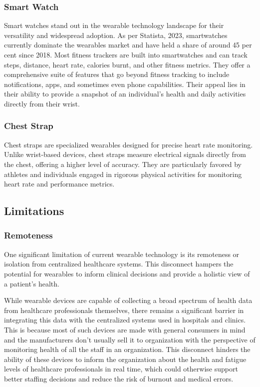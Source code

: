 \subsubsection{Smart Watch}
Smart watches stand out in the wearable technology landscape for their versatility and widespread adoption. As per Statista, 2023, smartwatches currently dominate the wearables market and have held a share of around 45 per cent since 2018. Most fitness trackers are built into smartwatches and can track steps, distance, heart rate, calories burnt, and other fitness metrics. They offer a comprehensive suite of features that go beyond fitness tracking to include notifications, apps, and sometimes even phone capabilities. Their appeal lies in their ability to provide a snapshot of an individual's health and daily activities directly from their wrist.

\subsubsection{Chest Strap}
Chest straps are specialized wearables designed for precise heart rate monitoring. Unlike wrist-based devices, chest straps measure electrical signals directly from the chest, offering a higher level of accuracy. They are particularly favored by athletes and individuals engaged in rigorous physical activities for monitoring heart rate and performance metrics.

\subsection{Limitations}
\subsubsection{Remoteness}
One significant limitation of current wearable technology is its remoteness or isolation from centralized healthcare systems. This disconnect hampers the potential for wearables to inform clinical decisions and provide a holistic view of a patient's health.

While wearable devices are capable of collecting a broad spectrum of health data from healthcare professionals themselves, there remains a significant barrier in integrating this data with the centralized systems used in hospitals and clinics. This is because most of such devices are made with general consumers in mind and the manufacturers don't usually sell it to organization with the perspective of monitoring health of all the staff in an organization. This disconnect hinders the ability of these devices to inform the organization about the health and fatigue levels of healthcare professionals in real time, which could otherwise support better staffing decisions and reduce the risk of burnout and medical errors.

